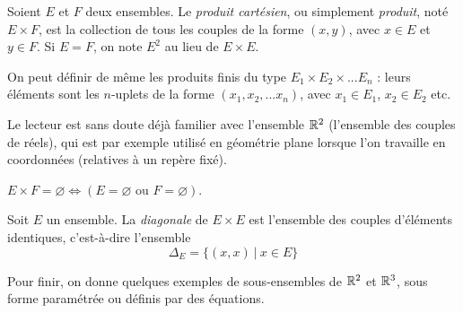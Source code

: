 \begin{definition}
Soient $E$ et $F$ deux ensembles. Le \emph{produit cartésien}, ou simplement \emph{produit}, noté $E\times F$, est la collection de tous les couples  de la forme $(x,y)$, avec $x\in E$ et $y\in F$. Si $E=F$, on note $E^2$ au lieu de $E\times E$. 

On peut définir de même les produits finis du type $E_1\times E_2 \times ... E_n$ : leurs éléments sont les $n$-uplets de la forme $(x_1, x_2, ... x_n)$, avec $x_1\in E_1$, $x_2\in E_2$ etc. 
\end{definition}

\begin{remarque}
Le lecteur est sans doute déjà familier avec l'ensemble $\mathbb{R}^2$ (l'ensemble des couples de réels), qui est par exemple utilisé en géométrie plane lorsque l'on travaille en coordonnées (relatives à un repère fixé).
\end{remarque}

\begin{remarque}
$E\times F = \varnothing \iff \left( E=\varnothing\text{ ou }F=\varnothing\right)$.
\end{remarque}

\begin{definition}[Diagonale]
Soit $E$ un ensemble. La \emph{diagonale} de $E\times E$ est l'ensemble des couples d'éléments identiques, c'est-à-dire l'ensemble
\[
\Delta_E = \{(x,x)\:|\: x\in E\}
\]
\end{definition}



Pour finir, on donne quelques exemples de sous-ensembles de $\mathbb{R}^2$ et $\mathbb{R}^3$, sous forme paramétrée ou définis par des équations.


